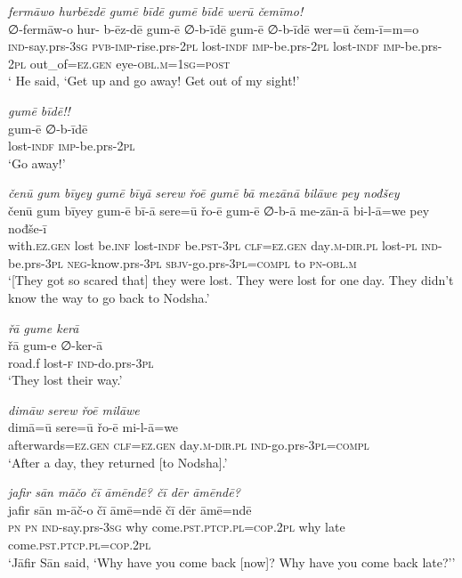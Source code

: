 \ea \label{ŠJ.37}
\textit{fermāwo hurbēzdē gumē bīdē gumē bīdē werū čemīmo!} \\ 
\gll ∅-fermāw-o hur- b-ēz-dē gum-ē ∅-b-īdē gum-ē ∅-b-īdē wer=ū čem-ī=m=o \\ 
 \textsc{ind-}say.prs\textsc{-3sg} \textsc{pvb-}\textsc{imp-}rise.prs-\textsc{2pl} lost\textsc{-indf} \textsc{imp-}be.prs-\textsc{2pl} lost\textsc{-indf} \textsc{imp-}be.prs-\textsc{2pl} out\_of\textsc{=ez.gen} eye\textsc{-obl}\textsc{.m}\textsc{=\textsc{1sg}}\textsc{=\textsc{post}} \\ 
\glt ` He said, ‘Get up and go away! Get out of my sight!'
\z 
 
\ea \label{ŠJ.38}
\textit{gumē bīdē!!} \\ 
\gll gum-ē ∅-b-īdē \\ 
 lost\textsc{-indf} \textsc{imp-}be.prs-\textsc{2pl} \\ 
\glt `Go away!'
\z 
 
\ea \label{ŠJ.39}
\textit{čenū gum bīyey gumē bīyā serew řoē gumē bā mezānā bilāwe pey nođšey} \\ 
\gll čenū gum bīyey gum-ē bī-ā sere=ū řo-ē gum-ē ∅-b-ā me-zān-ā bi-l-ā=we pey nođše-ī \\ 
 with\textsc{.ez.gen} lost be\textsc{.inf} lost\textsc{-indf} be\textsc{.pst}\textsc{-3pl} \textsc{clf}\textsc{=ez.gen} day\textsc{.m}\textsc{-dir}\textsc{.pl} lost\textsc{\textsc{-pl}} \textsc{ind-}be.prs\textsc{-3pl} \textsc{neg-}know.prs\textsc{-3pl} \textsc{sbjv-}go.prs\textsc{-3pl}\textsc{=compl} to \textsc{pn}\textsc{-obl}\textsc{.m} \\ 
\glt `[They got so scared that] they were lost. They were lost for one day. They didn’t know the way to go back to Nodsha.'
\z 
 
\ea \label{ŠJ.41}
\textit{řā gume kerā} \\ 
\gll řā gum-e ∅-ker-ā \\ 
 road.f lost\textsc{-f} \textsc{ind-}do.prs\textsc{-3pl} \\ 
\glt `They lost their way.'
\z 
 
\ea \label{ŠJ.42}
\textit{dimāw serew řoē milāwe} \\ 
\gll dimā=ū sere=ū řo-ē mi-l-ā=we \\ 
 afterwards\textsc{=ez.gen} \textsc{clf}\textsc{=ez.gen} day\textsc{.m}\textsc{-dir}\textsc{.pl} \textsc{ind-}go.prs\textsc{-3pl}\textsc{=compl} \\ 
\glt `After a day, they returned [to Nodsha].'
\z 
 
\ea \label{ŠJ.43}
\textit{jafir sān māčo čī āmēndē? čī dēr āmēndē?} \\ 
\gll jafir sān m-āč-o čī āmē=ndē čī dēr āmē=ndē \\ 
 \textsc{pn} \textsc{pn} \textsc{ind-}say.prs\textsc{-3sg} why come\textsc{.pst}\textsc{.ptcp}\textsc{.pl}\textsc{=cop}.\textsc{2pl} why late come\textsc{.pst}\textsc{.ptcp}\textsc{.pl}\textsc{=cop}.\textsc{2pl} \\ 
\glt `Jāfir Sān said, ‘Why have you come back [now]? Why have you come back late?’'
\z 
 
